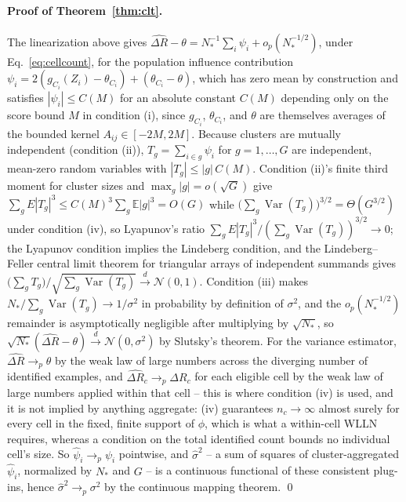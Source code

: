 \paragraph{Proof of Theorem~\ref{thm:clt}.} The linearization above gives
$\widehat{\Delta R}-\theta=N_*^{-1}\sum_i\psi_i+o_p(N_*^{-1/2})$, under
Eq.~\eqref{eq:cellcount}, for the population
influence contribution $\psi_i=2(g_{C_i}(Z_i)-\theta_{C_i})+(\theta_{C_i}-\theta)$, which
has zero mean by construction and satisfies $|\psi_i|\le C(M)$ for an absolute constant
$C(M)$ depending only on the score bound $M$ in condition (i), since $g_{C_i}$,
$\theta_{C_i}$, and $\theta$ are themselves averages of the bounded kernel
$A_{ij}\in[-2M,2M]$. Because clusters are mutually independent (condition (ii)),
$T_g=\sum_{i\in g}\psi_i$ for $g=1,\dots,G$ are independent, mean-zero random variables
with $|T_g|\le|g|\,C(M)$. Condition (ii)'s finite third moment for cluster sizes and
$\max_g|g|=o(\sqrt G)$ give
$\sum_gE|T_g|^3\le C(M)^3\sum_g\mathbb E|g|^3=O(G)$ while
$\bigl(\sum_g\operatorname{Var}(T_g)\bigr)^{3/2}=\Theta(G^{3/2})$ under condition (iv), so
Lyapunov's ratio $\sum_gE|T_g|^3/(\sum_g\operatorname{Var}(T_g))^{3/2}\to0$; the
Lyapunov condition implies the Lindeberg condition, and the Lindeberg--Feller central
limit theorem for triangular arrays of independent summands
\citep{serfling1980approximation,vandervaart1998asymptotic} gives
$\bigl(\sum_gT_g\bigr)/\sqrt{\sum_g\operatorname{Var}(T_g)}\xrightarrow{d}\mathcal N(0,1)$.
Condition (iii) makes $N_*/\sum_g\operatorname{Var}(T_g)\to1/\sigma^2$ in probability by
definition of $\sigma^2$, and the $o_p(N_*^{-1/2})$ remainder is asymptotically
negligible after multiplying by $\sqrt{N_*}$, so
$\sqrt{N_*}(\widehat{\Delta R}-\theta)\xrightarrow{d}\mathcal N(0,\sigma^2)$ by Slutsky's
theorem. For the variance estimator, $\widehat{\Delta R}\to_p\theta$ by the weak law of
large numbers across the diverging number of identified examples, and
$\widehat{\Delta R}_c\to_p\Delta R_c$ for each eligible cell by the weak law of large
numbers applied within that cell -- this is where condition (iv) is used, and it is not
implied by anything aggregate: (iv) guarantees $n_c\to\infty$ almost surely for every cell
in the fixed, finite support of $\phi$, which is what a within-cell WLLN requires, whereas
a condition on the total identified count bounds no individual cell's size. So $\widehat\psi_i\to_p\psi_i$ pointwise, and
$\widehat\sigma^2$ -- a sum of squares of cluster-aggregated $\widehat\psi_i$, normalized
by $N_*$ and $G$ -- is a continuous functional of these consistent plug-ins, hence
$\widehat\sigma^2\to_p\sigma^2$ by the continuous mapping theorem. \qed

